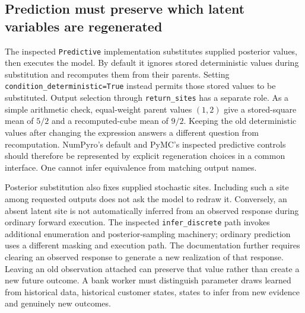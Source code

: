 \subsection{Prediction must preserve which latent variables are regenerated}

The inspected \texttt{Predictive} implementation substitutes supplied posterior values, then executes the model. By default it ignores stored deterministic values during substitution and recomputes them from their parents. Setting \texttt{condition\_deterministic=True} instead permits those stored values to be substituted. Output selection through \texttt{return\_sites} has a separate role. As a simple arithmetic check, equal-weight parent values $(1,2)$ give a stored-square mean of $5/2$ and a recomputed-cube mean of $9/2$. Keeping the old deterministic values after changing the expression answers a different question from recomputation. NumPyro's default and PyMC's inspected predictive controls should therefore be represented by explicit regeneration choices in a common interface. One cannot infer equivalence from matching output names. \cite{exec23_numpyro_sources,exec23_pymc_sources,exec23_numpyro_reference}

Posterior substitution also fixes supplied stochastic sites. Including such a site among requested outputs does not ask the model to redraw it. Conversely, an absent latent site is not automatically inferred from an observed response during ordinary forward execution. The inspected \texttt{infer\_discrete} path invokes additional enumeration and posterior-sampling machinery; ordinary prediction uses a different masking and execution path. The documentation further requires clearing an observed response to generate a new realization of that response. Leaving an old observation attached can preserve that value rather than create a new future outcome. A bank worker must distinguish parameter draws learned from historical data, historical customer states, states to infer from new evidence and genuinely new outcomes. \cite{exec23_numpyro_sources}

